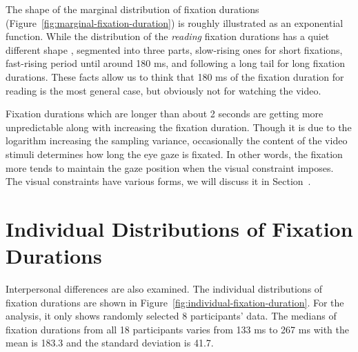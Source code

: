 \documentclass[oneside,master]{snueethesis}
\begin{document}
The shape of the marginal distribution of fixation durations (Figure~\ref{fig:marginal-fixation-duration}) is roughly illustrated as an exponential function. While the distribution of the \textit{reading} fixation durations has a quiet different shape \cite{Feng2006}, segmented into three parts, slow-rising ones for short fixations, fast-rising period until around 180 ms, and following a long tail for long fixation durations. These facts allow us to think that 180 ms of the fixation duration for reading is the most general case, but obviously not for watching the video.

Fixation durations which are longer than about 2 seconds are getting more unpredictable along with increasing the fixation duration. Though it is due to the logarithm increasing the sampling variance, occasionally the content of the video stimuli determines how long the eye gaze is fixated. In other words, the fixation more tends to maintain the gaze position when the visual constraint imposes. The visual constraints have various forms, we will discuss it in Section~.


\section{Individual Distributions of Fixation Durations}

Interpersonal differences are also examined. The individual distributions of fixation durations are shown in Figure~\ref{fig:individual-fixation-duration}. For the analysis, it only shows randomly selected 8 participants' data. The medians of fixation durations from all 18 participants varies from 133 ms to 267 ms with the mean is 183.3 and the standard deviation is 41.7.
\end{document}
